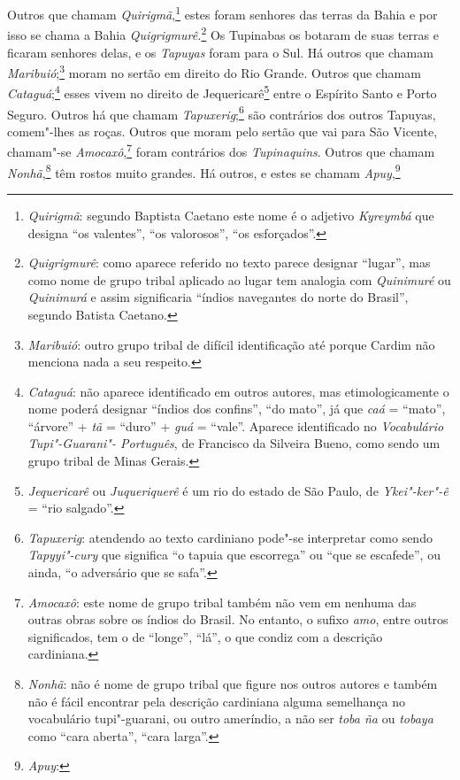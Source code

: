 \begin{linenumbers}
 Outros que chamam \textit{Quirigmã},\footnote{ \textit{Quirigmã}:  
segundo Baptista Caetano este nome é o adjetivo \textit{Kyreymbá} que
designa ``os valentes'', ``os valorosos'', ``os esforçados''.} estes
foram senhores das terras da Bahia e por isso se chama a Bahia
\textit{Quigrigmurê.}\footnote{ \textit{Quigrigmurê}: como aparece
referido no texto parece designar ``lugar'', mas como nome de grupo
tribal aplicado ao lugar tem analogia com \textit{Quinimuré} ou
\textit{Quinimurá} e assim significaria ``índios navegantes do norte do
Brasil'', segundo Batista Caetano.} Os Tupinabas os botaram de
suas terras e ficaram senhores delas, e os \textit{Tapuyas} foram para
o Sul. Há outros que chamam \textit{Maribuió};\footnote{ \textit{Maribuió}: 
outro grupo tribal de difícil identificação até
porque Cardim não menciona nada a seu respeito.} moram no
sertão em direito do Rio Grande. Outros que chamam 
\textit{Cataguá};\footnote{ \textit{Cataguá}: não aparece identificado em outros
autores, mas etimologicamente o nome poderá designar ``índios dos
confins'', ``do mato'', já que \textit{caá} = ``mato'', ``árvore'' +
\textit{tã} = ``duro'' + \textit{guá} = ``vale''. Aparece identificado no
\textit{Vocabulário Tupi"-Guarani"- Português}, de Francisco da Silveira
Bueno, como sendo um grupo tribal de Minas Gerais.} esses
vivem no direito de Jequericarê\footnote{ \textit{Jequericarê} ou
\textit{Juqueriquerê} é um rio do estado de São Paulo, de
\textit{Ykei"-ker"-ê} = ``rio salgado''.} entre o Espírito Santo e Porto
Seguro. Outros há que chamam 
\textit{Tapuxerig};\footnote{ \textit{Tapuxerig}: atendendo ao texto 
cardiniano pode"-se interpretar
como sendo \textit{Tapyyi"-cury} que significa ``o tapuia que escorrega''
ou ``que se escafede'', ou ainda, ``o adversário que se safa''.} 
são contrários dos outros Tapuyas, comem"-lhes as roças. Outros que
moram pelo sertão que vai para São Vicente, chamam"-se
\textit{Amocaxô},\footnote{ \textit{Amocaxô}: este nome de grupo
tribal também não vem em nenhuma das outras obras sobre os índios do
Brasil. No entanto, o sufixo \textit{amo}, entre outros significados,
tem o de ``longe'', ``lá'', o que condiz com a descrição
cardiniana.} foram contrários dos \textit{Tupinaquins}. Outros
que chamam \textit{Nonhã},\footnote{ \textit{Nonhã}: não é nome de
grupo tribal que figure nos outros autores e também não é fácil
encontrar pela descrição cardiniana alguma semelhança no vocabulário
tupi"-guarani, ou outro ameríndio, a não ser \textit{toba ña} ou
\textit{tobaya} como ``cara aberta'', ``cara larga''.} têm rostos
muito grandes. Há outros, e estes se chamam \textit{Apuy},\footnote{ \textit{Apuy}: 
}
\end{linenumbers}

